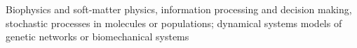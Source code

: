 \documentclass[10pt,a4paper]{altacv}
\begin{document}
Biophysics and soft-matter physics,  information processing and decision making, stochastic processes in molecules or populations; dynamical systems models of genetic networks or biomechanical systems


%
%
%
\end{document}
